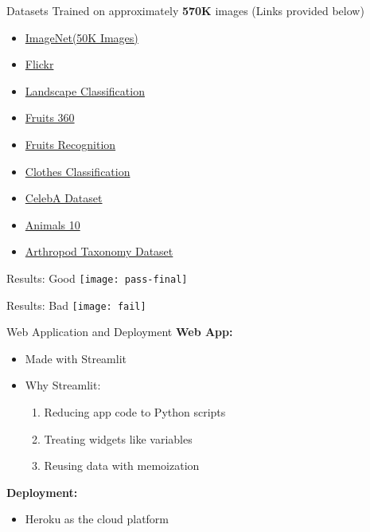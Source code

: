 \documentclass[12pt]{beamer}
\begin{document}
\begin{frame}{Datasets}
	Trained on approximately \textbf{570K} images (Links provided below)
	\begin{itemize}
		\item \href{https://www.kaggle.com/lijiyu/imagenet}{ImageNet(50K Images)}\\
		\item \href{https://www.kaggle.com/hsankesara/flickr-image-dataset}{Flickr}\\
		\item \href{https://www.kaggle.com/huseynguliyev/landscape-classification}{Landscape Classification}\\
		\item \href{https://www.kaggle.com/moltean/fruits}{Fruits 360}\\
		\item \href{https://www.kaggle.com/chrisfilo/fruit-recognition}{Fruits Recognition}\\
		\item \href{https://www.kaggle.com/salil007/caavo}{Clothes Classification}\\
		\item \href{https://www.kaggle.com/jessicali9530/celeba-dataset}{CelebA Dataset}\\
		\item \href{https://www.kaggle.com/alessiocorrado99/animals10}{Animals 10}\\
		\item \href{https://www.kaggle.com/mistag/arthropod-taxonomy-orders-object-detection-dataset}{Arthropod Taxonomy Dataset}\\
	\end{itemize}
\end{frame}

\begin{frame}{Results: Good}
	\texttt{[image: pass-final]}
\end{frame}

\begin{frame}{Results: Bad}
	\texttt{[image: fail]}
\end{frame}

\begin{frame}{Web Application and Deployment}
	\textbf{Web App:}\\
	\begin{itemize}
		\item Made with Streamlit\\
		\item Why Streamlit:\\
			\begin{enumerate}
				\item Reducing app code to Python scripts
				\item Treating widgets like variables
				\item Reusing data with memoization
			\end{enumerate}
	\end{itemize}
	\textbf{Deployment:}
	\begin{itemize}
		\item Heroku as the cloud platform
	\end{itemize}
\end{frame}
\end{document}
